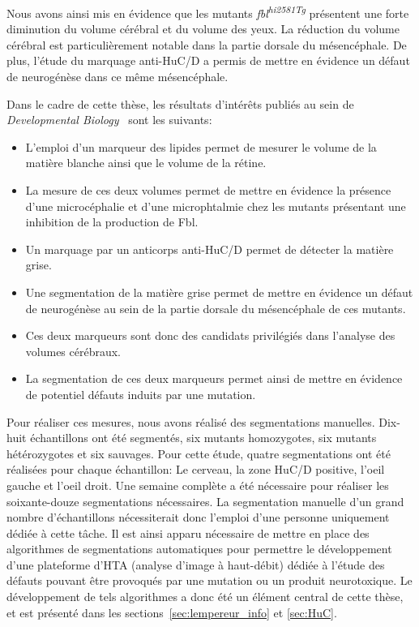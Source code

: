 \documentclass[\main/main.tex]{subfiles}
\begin{document}
%
Nous avons ainsi mis en évidence que les mutants \textit{fbl\textsuperscript{hi2581Tg}}
présentent une forte diminution du volume cérébral et du volume des yeux.
%
La réduction du volume cérébral est particulièrement notable
dans la partie dorsale du mésencéphale.
%
De plus, l'étude du marquage anti-HuC/D a permis de mettre en évidence
un défaut de neurogénèse dans ce même mésencéphale.

%
Dans le cadre de cette thèse, les résultats d'intérêts publiés au sein de
\emph{Developmental Biology}~\citep{bouffard_2018} sont les suivants:

\begin{itemize}
    
    \item
    L'emploi d'un marqueur des lipides permet de mesurer le volume de la matière blanche
    ainsi que le volume de la rétine.
    
    \item
    La mesure de ces deux volumes permet de mettre en évidence la présence d'une microcéphalie
    et d'une microphtalmie chez les mutants présentant une inhibition de la production de Fbl.
    
    \item
    Un marquage par un anticorps anti-HuC/D permet de détecter la matière grise.
    
    \item
    Une segmentation de la matière grise permet de mettre en évidence
    un défaut de neurogénèse au sein de la partie dorsale du mésencéphale de ces mutants.
    
    \item
    Ces deux marqueurs sont donc des candidats privilégiés
    dans l'analyse des volumes cérébraux.
    
    \item
    La segmentation de ces deux marqueurs permet ainsi de mettre en évidence
    de potentiel défauts induits par une mutation.
    
\end{itemize}


%
Pour réaliser ces mesures, nous avons réalisé des segmentations manuelles.
%
Dix-huit échantillons ont été segmentés,
six mutants homozygotes, six mutants hétérozygotes et six sauvages.
%
Pour cette étude, quatre segmentations ont été réalisées pour chaque échantillon:
Le cerveau, la zone HuC/D positive, l'oeil gauche et l'oeil droit.
%
Une semaine complète a été nécessaire pour réaliser les soixante-douze segmentations nécessaires.
%
La segmentation manuelle d'un grand nombre d'échantillons
nécessiterait donc l'emploi d'une personne uniquement dédiée à cette tâche.
%
Il est ainsi apparu nécessaire de mettre en place des algorithmes de segmentations automatiques
pour permettre le développement d'une plateforme d'HTA (analyse d'image à haut-débit) dédiée à l'étude
des défauts pouvant être provoqués par une mutation ou un produit neurotoxique.
%
Le développement de tels algorithmes a donc été un élément central de cette thèse, et est présenté dans les sections~\ref{sec:lempereur_info} et \ref{sec:HuC}.
\end{document}
